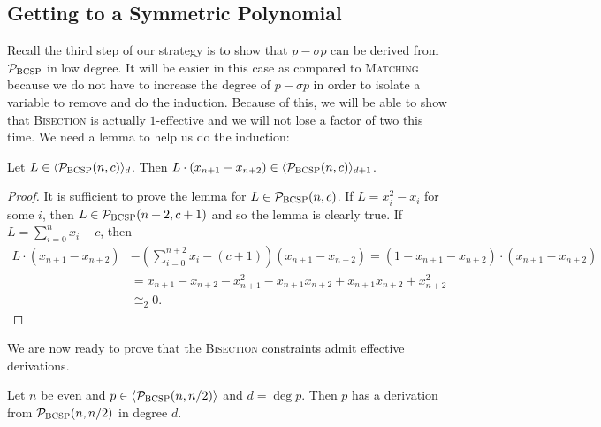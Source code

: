 \subsection{Getting to a Symmetric Polynomial}
Recall the third step of our strategy is to show that $p - \sigma p$ can be derived from $\mathcal P_{\textsc{BCSP}}$ in low degree. It will be easier in this case as compared to \textsc{Matching} because we do not have to increase the degree of $p - \sigma p$ in order to isolate a variable to remove and do the induction. Because of this, we will be able to show that \textsc{Bisection} is actually $1$-effective and we will not lose a factor of two this time.
We need a lemma to help us do the induction:
\begin{lemma}\label{lem:bcsp-induct}
Let $L \in \langle \mathcal P_{\textsc{BCSP}}(n,c) \rangle_d$. Then $L\cdot (x_{n+1} - x_{n+2}) \in \langle \mathcal P_{\textsc{BCSP}}(n,c) \rangle_{d+1}$.
\end{lemma}
\begin{proof}
It is sufficient to prove the lemma for $L \in \mathcal P_{\textsc{BCSP}}(n,c)$. If $L = x_i^2 - x_i$ for some $i$, then $L \in \mathcal P_{\textsc{BCSP}}(n+2,c+1)$ and so the lemma is clearly true. If $L = \sum_{i=0}^n x_i - c$, then 
\begin{align*}
L\cdot (x_{n+1} - x_{n+2}) &- \left(\sum_{i=0}^{n+2} x_i - (c+1)\right)(x_{n+1} - x_{n+2}) = (1-x_{n+1} - x_{n+2}) \cdot (x_{n+1} - x_{n+2}) \\
&= x_{n+1} - x_{n+2} - x_{n+1}^2 - x_{n+1}x_{n+2} + x_{n+1}x_{n+2} + x_{n+2}^2 \\
&\cong_2 0.
\end{align*} 
\end{proof}
We are now ready to prove that the \textsc{Bisection} constraints admit effective derivations.
\begin{theorem}\label{thm:bisec-effective}
Let $n$ be even and $p \in \langle \mathcal P_{\textsc{BCSP}}(n,n/2) \rangle$ and $d = \deg p$. Then $p$ has a derivation from $\mathcal P_{\textsc{BCSP}}(n,n/2)$ in degree $d$. 
\end{theorem}
